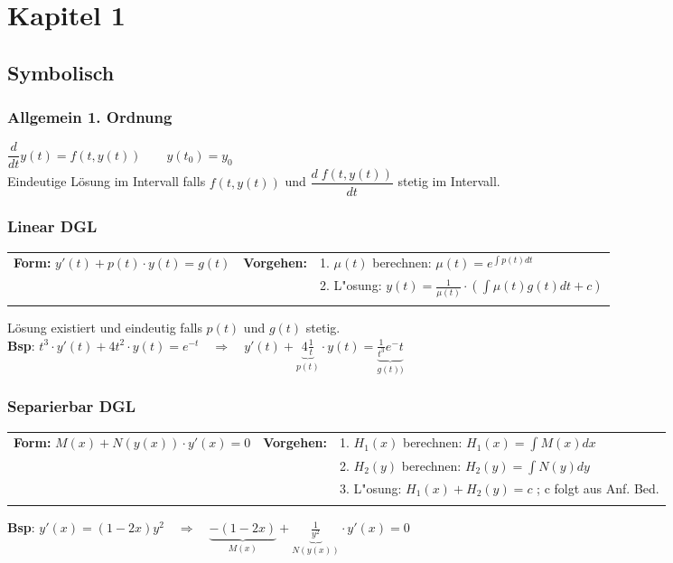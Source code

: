 \section{Kapitel 1}

\subsection{Symbolisch}

\subsubsection{Allgemein 1. Ordnung}
$\dfrac{d}{dt}y(t)=f(t,y(t)) \qquad y(t_0)=y_0$\\
Eindeutige Lösung im Intervall falls $f(t,y(t))$ und $\dfrac{d \; f(t,y(t))}{dt}$ stetig im Intervall.
\subsubsection{Linear DGL}
\begin{tabular}{p{6cm}p{2cm}p{10.5cm}}
\textbf{Form:} $y'(t) + p(t) \cdot y(t) = g(t)$ &
\textbf{Vorgehen:}              &

1. $\mu(t)$ berechnen: $\mu(t) = e^{\int p(t) dt}$ \\ &&
2. L"osung: $y(t) = \frac{1}{\mu(t)} \cdot ( \int \mu(t) g(t) dt +c)$ \\ &&
\end{tabular}
Lösung existiert und eindeutig falls $p(t)$ und $g(t)$ stetig.\\
\textbf{Bsp}: $t^3 \cdot y'(t) + 4 t^2 \cdot y(t) = e^{-t} \quad \Longrightarrow \quad y'(t) + \underbrace{4 \frac{1}{t}}_{p(t)} \cdot y(t) = \underbrace{\frac{1}{t^3} e^-t}_{g(t))}$

\subsubsection{Separierbar DGL}
\begin{tabular}{p{6cm}p{2cm}p{10.5cm}}
\textbf{Form:} $M(x) + N(y(x))\cdot y'(x) = 0$ &
\textbf{Vorgehen:}              &

1. $H_1(x)$ berechnen: $H_1(x) = \int M(x) dx$ \\ &&
2. $H_2(y)$ berechnen: $H_2(y) = \int N(y)dy$ \\ &&
3. L"osung: $H_1(x) + H_2(y) = c$ ; c folgt aus Anf. Bed.\\\\
\end{tabular}
\textbf{Bsp}: $y'(x) = (1-2x)y^2 \quad \Longrightarrow \quad \underbrace{-(1-2x)}_{M(x)} + \underbrace{\frac{1}{y^2}}_{N(y(x))} \cdot y'(x) = 0$

